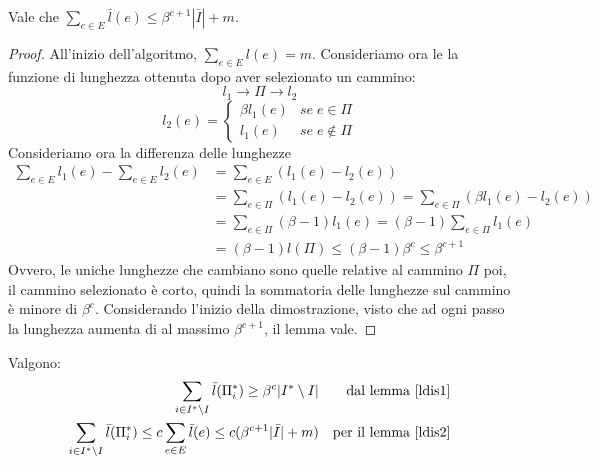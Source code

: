 \begin{lemma}
    \label{ldis2}
    Vale che $\sum_{e \in E}\bar{l}(e) \leq \beta^{c+1}|\bar{I}| + m$.
\end{lemma}
\begin{proof}
    All'inizio dell'algoritmo, $\sum_{e \in E} l(e) = m$.
    Consideriamo ora le la funzione di lunghezza ottenuta dopo aver selezionato 
    un cammino:
    $$l_1 \longrightarrow \Pi \longrightarrow l_2$$
    \[ 
        l_2(e) = 
        \begin{cases}
        \beta l_1(e) & \mathit{se}\;e \in \Pi\\
        l_1(e) & \mathit{se}\;e \notin \Pi
     \end{cases}
    \]
    Consideriamo ora la differenza delle lunghezze
    \begin{equation}
        \begin{aligned}
            \sum_{e \in E} l_1(e) - \sum_{e \in E} l_2(e)&= \sum_{e \in E} (l_1(e) - l_2(e))\\
            &= \sum_{e \in \Pi} (l_1(e) - l_2(e)) = \sum_{e \in \Pi} (\beta l_1(e) - l_2(e))\\
            &= \sum_{e \in \Pi} (\beta -1)l_1(e) = (\beta -1) \sum_{e \in \Pi} l_1(e)\\
            &= (\beta -1)l(\Pi) \leq (\beta -1)\beta^c \leq \beta^{c+1}
        \end{aligned}
    \end{equation}
    Ovvero, le uniche lunghezze che cambiano sono quelle relative al cammino $\Pi$ poi, 
    il cammino selezionato è corto, quindi la sommatoria delle lunghezze sul cammino è minore di 
    $\beta^{c}$.
    Considerando l'inizio della dimostrazione, visto che ad ogni passo la lunghezza aumenta di al 
    massimo $\beta^{c+1}$, il lemma vale.
\end{proof}
\begin{remark}
    \label{oss3dis}
    Valgono:
    \begin{equation}
        \begin{aligned}
            \sum_{i \in I^* \setminus I} \bar{l}(\Pi_i^*) \geq \beta^c|I^* \setminus I| && \text{dal lemma \ref{ldis1}}\\
            \sum_{i \in I^* \setminus I} \bar{l}(\Pi_i^*) \leq c\sum_{e \in E} \bar{l}(e) \leq c(\beta ^{c+1}|\bar{I}| + m)
            && \text{per il lemma \ref{ldis2}}
        \end{aligned}
    \end{equation}
\end{remark}

